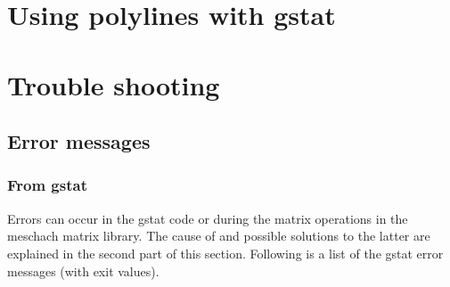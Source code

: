 \documentclass[a4paper,12pt]{book}
\renewcommand{\cite}{\citet}
\newcommand{\code}[1]{\texttt{#1}}
\newcommand{\iskey}[1]{\htmlref{\code{{#1}}}{key:#1}}
\begin{document}
% 
% 

\chapter{Using polylines with gstat}
\label{app:edges}

\chapter{Trouble shooting}
\label{app:trouble}

\section{Error messages}

\subsection{From gstat}

Errors can occur in the gstat code or during the matrix operations in
the meschach matrix library. The cause of and possible solutions to the
latter are explained in the second part of this section. Following is a
list of the gstat error messages (with exit values).
\end{document}
